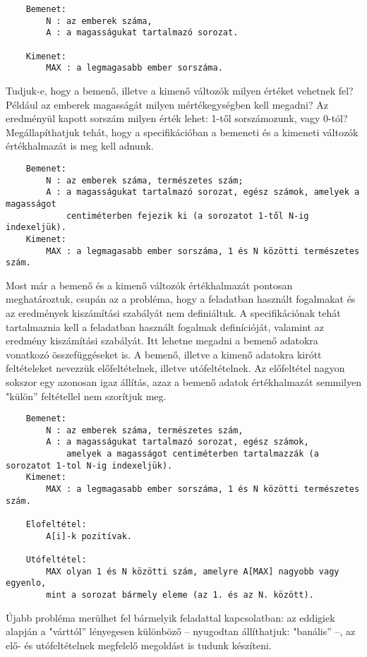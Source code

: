 \documentclass[margin=0px]{article}
\begin{document}
\begin{verbatim}
	Bemenet: 
	    N : az emberek száma,
	    A : a magasságukat tartalmazó sorozat.
	
	Kimenet:
	    MAX : a legmagasabb ember sorszáma.
	\end{verbatim}


Tudjuk-e, hogy a bemenő, illetve a kimenő változók milyen értéket vehetnek fel? Például az emberek magasságát milyen mértékegységben kell megadni? Az eredményül kapott sorszám milyen érték lehet: 1-től sorszámozunk, vagy 0-tól? Megállapíthatjuk tehát, hogy a specifikációban a bemeneti és a kimeneti változók értékhalmazát is meg kell adnunk.

\begin{verbatim}
	Bemenet:
	    N : az emberek száma, természetes szám;
	    A : a magasságukat tartalmazó sorozat, egész számok, amelyek a magasságot
	        centiméterben fejezik ki (a sorozatot 1-től N-ig indexeljük).
	Kimenet: 
	    MAX : a legmagasabb ember sorszáma, 1 és N közötti természetes szám.
	\end{verbatim}

Most már a bemenő és a kimenő változók értékhalmazát pontosan meghatároztuk, csupán az a probléma, hogy a feladatban használt fogalmakat és az eredmények kiszámítási szabályát nem definiáltuk. A specifikációnak tehát tartalmaznia kell a feladatban használt fogalmak definícióját, valamint az eredmény kiszámítási szabályát. Itt lehetne megadni a bemenő adatokra vonatkozó összefüggéseket is. A bemenő, illetve a kimenő adatokra kirótt feltételeket nevezzük előfeltételnek, illetve utófeltételnek. Az előfeltétel nagyon sokszor egy azonosan igaz állítás, azaz a bemenő adatok értékhalmazát semmilyen "külön” feltétellel nem szorítjuk meg.

\begin{verbatim}
	Bemenet: 
     	N : az emberek száma, természetes szám,
     	A : a magasságukat tartalmazó sorozat, egész számok, 
        	amelyek a magasságot centiméterben tartalmazzák (a sorozatot 1-tol N-ig indexeljük).
	Kimenet:	
     	MAX : a legmagasabb ember sorszáma, 1 és N közötti természetes szám.
	
	Elofeltétel: 
    	A[i]-k pozitívak.
	
	Utófeltétel: 	
	    MAX olyan 1 és N közötti szám, amelyre A[MAX] nagyobb vagy egyenlo, 	
	    mint a sorozat bármely eleme (az 1. és az N. között).
	\end{verbatim}

Újabb probléma merülhet fel bármelyik feladattal kapcsolatban: az eddigiek alapján a "várttól” lényegesen különböző – nyugodtan állíthatjuk: "banális” –, az elő- és utófeltételnek megfelelő megoldást is tudunk készíteni.
\end{document}
